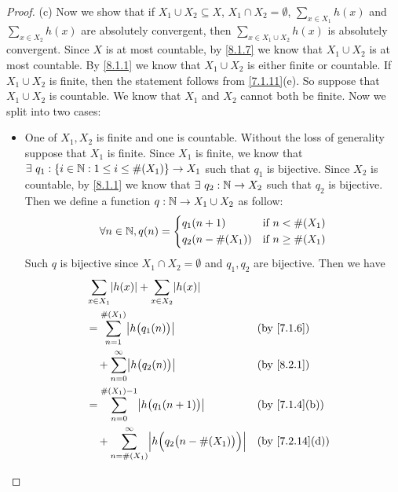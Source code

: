 \begin{proof}{(c)}
  Now we show that if \(X_1 \cup X_2 \subseteq X\), \(X_1 \cap X_2 = \emptyset\), \(\sum_{x \in X_1} h(x)\) and \(\sum_{x \in X_2} h(x)\) are absolutely convergent, then \(\sum_{x \in X_1 \cup X_2} h(x)\) is absolutely convergent.
  Since \(X\) is at most countable, by \cref{8.1.7} we know that \(X_1 \cup X_2\) is at most countable.
  By \cref{8.1.1} we know that \(X_1 \cup X_2\) is either finite or countable.
  If \(X_1 \cup X_2\) is finite, then the statement follows from \cref{7.1.11}(e).
  So suppose that \(X_1 \cup X_2\) is countable.
  We know that \(X_1\) and \(X_2\) cannot both be finite.
  Now we split into two cases:
  \begin{itemize}
    \item One of \(X_1, X_2\) is finite and one is countable.
          Without the loss of generality suppose that \(X_1\) is finite.
          Since \(X_1\) is finite, we know that \(\exists\ q_1 : \{i \in \mathbb{N} : 1 \leq i \leq \#(X_1)\} \to X_1\) such that \(q_1\) is bijective.
          Since \(X_2\) is countable, by \cref{8.1.1} we know that \(\exists\ q_2 : \mathbb{N} \to X_2\) such that \(q_2\) is bijective.
          Then we define a function \(q : \mathbb{N} \to X_1 \cup X_2\) as follow:
          \[
            \forall n \in \mathbb{N}, q(n) = \begin{dcases}
              q_1(n + 1)       & \text{if } n < \#(X_1)    \\
              q_2(n - \#(X_1)) & \text{if } n \geq \#(X_1)
            \end{dcases}
          \]
          Such \(q\) is bijective since \(X_1 \cap X_2 = \emptyset\) and \(q_1, q_2\) are bijective.
          Then we have
          \begin{align*}
             & \sum_{x \in X_1} \abs{h(x)} + \sum_{x \in X_2} \abs{h(x)}                                                                              \\
             & = \sum_{n = 1}^{\#(X_1)} \abs{h\big(q_1(n)\big)}                                                     &  & \text{(by \cref{7.1.6})}     \\
             & \quad + \sum_{n = 0}^\infty \abs{h\big(q_2(n)\big)}                                                  &  & \text{(by \cref{8.2.1})}     \\
             & = \sum_{n = 0}^{\#(X_1) - 1} \abs{h\big(q_1(n + 1)\big)}                                             &  & \text{(by \cref{7.1.4}(b))}  \\
             & \quad + \sum_{n = \#(X_1)}^\infty \abs{h\Big(q_2\big(n - \#(X_1)\big)\Big)}                          &  & \text{(by \cref{7.2.14}(d))} \\

\end{align*}
\end{itemize}
\end{proof}
